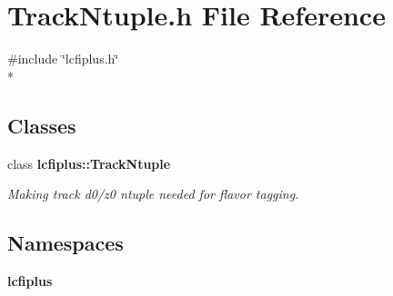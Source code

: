\section{Track\-Ntuple.\-h File Reference}
\label{TrackNtuple_8h}
{\ttfamily \#include \char`\"{}lcfiplus.\-h\char`\"{}}\\*
\subsection*{Classes}
\begin{DoxyCompactItemize}
\item 
class {\bf lcfiplus\-::\-Track\-Ntuple}
\begin{DoxyCompactList}\small\item\em Making track d0/z0 ntuple needed for flavor tagging. \end{DoxyCompactList}\end{DoxyCompactItemize}
\subsection*{Namespaces}
\begin{DoxyCompactItemize}
\item 
{\bf lcfiplus}
\end{DoxyCompactItemize}
